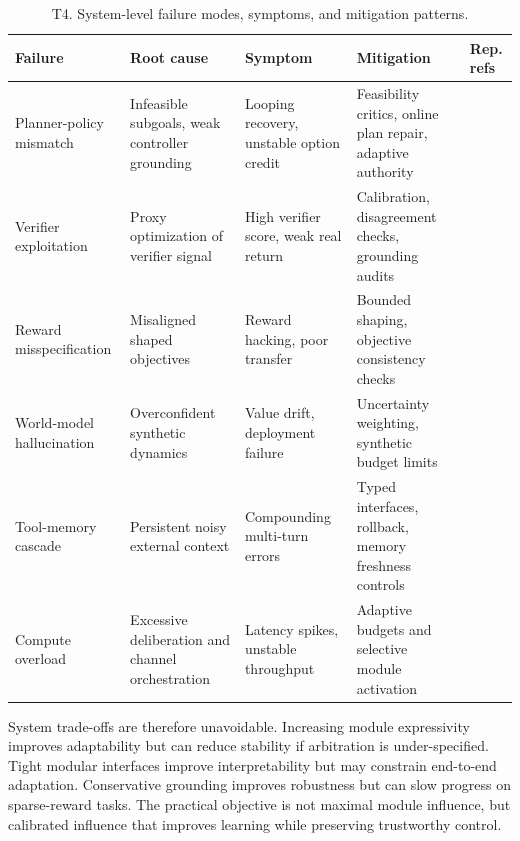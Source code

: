 \documentclass[pdflatex,sn-mathphys-num]{sn-jnl}
\begin{document}
\begin{table}[t]
\centering
\small
\setlength{\tabcolsep}{4pt}
\begin{tabularx}{\textwidth}{P{2.2cm}P{2.3cm}P{2.2cm}P{2.6cm}Y}
\toprule
\textbf{Failure} & \textbf{Root cause} & \textbf{Symptom} & \textbf{Mitigation} & \textbf{Rep. refs}\\
\midrule
Planner-policy mismatch & Infeasible subgoals, weak controller grounding & Looping recovery, unstable option credit & Feasibility critics, online plan repair, adaptive authority & \cite{arxiv_p_2204_01691,arxiv_p_2602_16165}\\
Verifier exploitation & Proxy optimization of verifier signal & High verifier score, weak real return & Calibration, disagreement checks, grounding audits & \cite{arxiv_p_2602_06493,arxiv_p_2602_12579}\\
Reward misspecification & Misaligned shaped objectives & Reward hacking, poor transfer & Bounded shaping, objective consistency checks & \cite{arxiv_p_2310_12931,arxiv_p_2309_11489}\\
World-model hallucination & Overconfident synthetic dynamics & Value drift, deployment failure & Uncertainty weighting, synthetic budget limits & \cite{arxiv_p_2602_02454,arxiv_p_2602_11075}\\
Tool-memory cascade & Persistent noisy external context & Compounding multi-turn errors & Typed interfaces, rollback, memory freshness controls & \cite{arxiv_p_2404_03648,arxiv_p_2602_00994}\\
Compute overload & Excessive deliberation and channel orchestration & Latency spikes, unstable throughput & Adaptive budgets and selective module activation & \cite{arxiv_p_2602_07848,doi_p_10_48448_q4pk_2g71}\\
\bottomrule
\end{tabularx}
\caption{T4. System-level failure modes, symptoms, and mitigation patterns.}
\label{tab:t4_fail}
\end{table}

System trade-offs are therefore unavoidable. Increasing module expressivity improves adaptability but can reduce stability if arbitration is under-specified. Tight modular interfaces improve interpretability but may constrain end-to-end adaptation. Conservative grounding improves robustness but can slow progress on sparse-reward tasks. The practical objective is not maximal module influence, but calibrated influence that improves learning while preserving trustworthy control.
\end{document}

